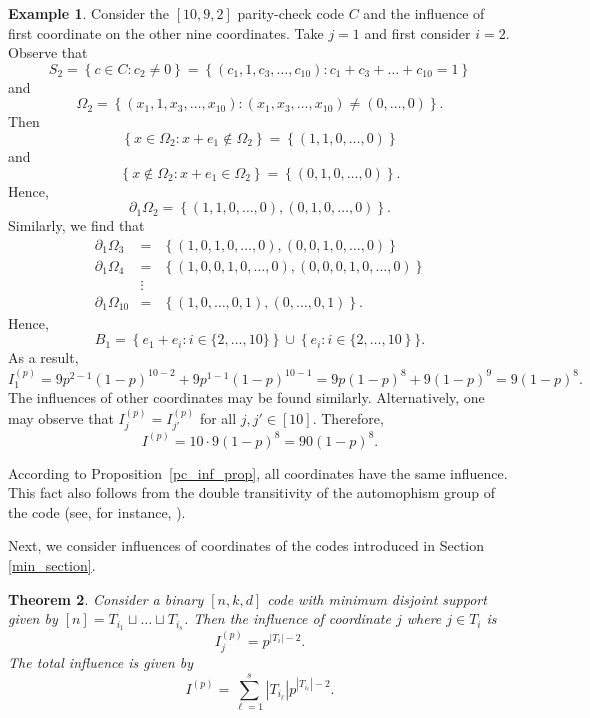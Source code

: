 \documentclass[12pt]{article}
\newtheorem{theorem}{Theorem}[section]
\theoremstyle{definition}
\newtheorem{example}[theorem]{Example}
\begin{document}
\begin{example} \label{pc_ex}
    Consider the $[10,9,2]$ parity-check code $C$ and the influence of first coordinate on the other nine coordinates. Take $j=1$ and first consider $i=2$. Observe that $$S_2=\left\{ c \in C\colon c_2 \neq 0\right\}=\left\{ \left(c_1, 1, c_3, \dots, c_{10} \right)\colon c_1+ c_3+ \dots+ c_{10} = 1 \right\} %
    $$ 
    and $$\Omega_2=\left\{ \left(x_1, 1, x_3, \dots, x_{10} \right)\colon  \left(x_1, x_3, \dots, x_{10} \right) \neq (0, \dots, 0) \right\}.$$
    Then $$\left\{ x \in \Omega_2\colon x+e_1 \notin \Omega_2 \right\}=\left\{ (1,1,0,\dots, 0) \right\}$$ and $$\left\{ x \notin \Omega_2\colon x+e_1 \in \Omega_2 \right\}=\left\{ (0,1,0,\dots, 0) \right\}.$$ Hence, $$\partial_1 \Omega_2=
    \left\{  (1,1,0,\dots, 0), (0,1,0,\dots, 0) \right\}.$$ Similarly, we find that 
    $$
    \begin{array}{ccl}
    \partial_1 \Omega_3&=&
    \left\{  (1,0,1, 0,\dots, 0), (0,0, 1,0,\dots, 0) \right\}\\
    \partial_1 \Omega_4&=&
    \left\{  (1,0,0, 1, 0,\dots, 0), (0,0, 0,1,0,\dots, 0) \right\}\\
    & \vdots & \\
    \partial_1 \Omega_{10}&=&
    \left\{  (1, 0,\dots, 0, 1), (0,\dots, 0, 1) \right\}.
    \end{array}
    $$
    Hence, $$B_1 = \left\{ e_1+e_i\colon i \in \{ 2, \dots, 10 \} \right\} \cup \left\{ e_i \colon i \in \{ 2, \dots, 10 \right\}\}.$$
   As a result, $$I_1^{(p)} = 
   9p^{2-1}(1-p)^{10-2}+9p^{1-1}(1-p)^{10-1}=9p(1-p)^8+9(1-p)^9=9(1-p)^8.$$ The influences of other coordinates may be found similarly. Alternatively, one may observe that $I_j^{(p)}=I_{j'}^{(p)}$ for all $j, j' \in [10]$. Therefore, 
   $$I^{(p)}=10\cdot 9(1-p)^8=90(1-p)^8.$$
\end{example}

According to Proposition~\ref{pc_inf_prop}, all coordinates have the same influence. This fact also follows from the double transitivity of the automophism group of the code (see, for instance, \cite{Kumar_16}). 

Next, we consider influences of coordinates of the codes introduced in Section \ref{min_section}. 

\begin{theorem} \label{min_thm}
Consider a binary $[n,k,d]$ code with minimum disjoint support given by $[n] = T_{i_1} \sqcup \dots \sqcup T_{i_s}$. Then the influence of coordinate $j$ where $j \in T_i$ is
$$
I_j^{(p)} = p^{| T_i |-2}.
$$
The total influence  is given by
$$I^{(p)}=\sum_{\ell=1}^s | T_{i_\ell} | p^{| T_{i_\ell} | -2}.$$
\end{theorem}
\end{document}

